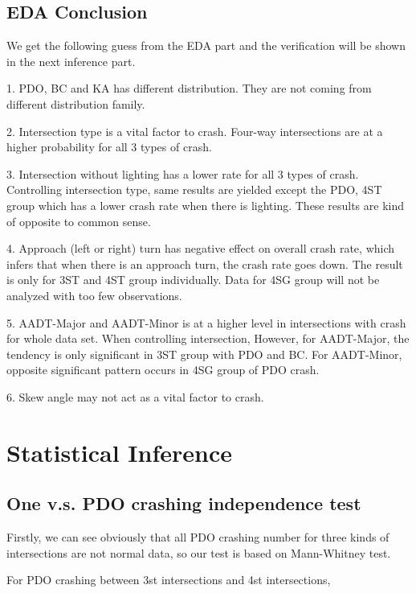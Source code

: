 \documentclass[11pt]{scrartcl} %
\begin{document}
\subsection{EDA Conclusion}

We get the following guess from the EDA part and the verification will be shown in the next inference part.

1. PDO, BC and KA has different distribution. They are not coming from different distribution family.

2. Intersection type is a vital factor to crash. Four-way intersections are at a higher probability for all 3 types of crash.

3. Intersection without lighting has a lower rate for all 3 types of crash. Controlling intersection type, same results are yielded except the PDO, 4ST group which has a lower crash rate when there is lighting. These results are kind of opposite to common sense.

4. Approach (left or right) turn has negative effect on overall crash rate, which infers that when there is an approach turn, the crash rate goes down. The result is only for 3ST and 4ST group individually. Data for 4SG group will not be analyzed with too few observations.

5. AADT-Major and AADT-Minor is at a higher level in intersections with crash for whole data set. When controlling intersection, However, for AADT-Major, the tendency is only significant in 3ST group with PDO and BC. For AADT-Minor, opposite significant pattern occurs in 4SG group of PDO crash.

6. Skew angle may not act as a vital factor to crash. 

\section{Statistical Inference}

\subsection{One v.s. PDO crashing independence test}

Firstly, we can see obviously that all PDO crashing number for three kinds of intersections are not normal data, so our test is based on Mann-Whitney test.

\par

For PDO crashing between 3st intersections and 4st intersections,
\end{document}
